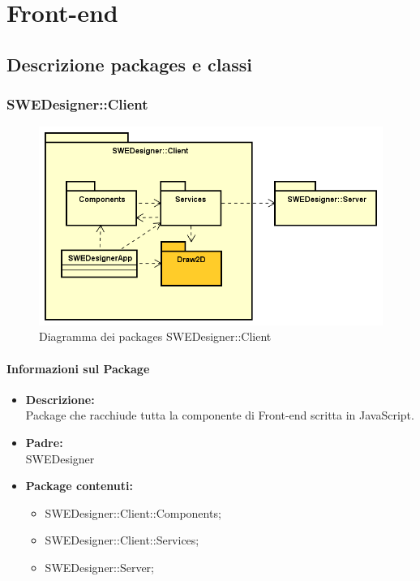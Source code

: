 \section{Front-end}

	\subsection{Descrizione packages e classi}

	\subsubsection{SWEDesigner::Client}
		 \begin{figure}[h!]
		\centering
		\includegraphics[scale=0.4]{Disegnetti/Front-End.png}
		\caption{Diagramma dei packages SWEDesigner::Client}
 		\end{figure}
		\paragraph{Informazioni sul Package}
		\begin{itemize}
			\item \textbf{Descrizione: }\\
			Package che racchiude tutta la componente di Front-end scritta in JavaScript.
			\item \textbf{Padre: }\\ SWEDesigner
			\item \textbf{Package contenuti: }
			\begin{itemize}
				\item SWEDesigner::Client::Components;
				\item SWEDesigner::Client::Services;
				\item SWEDesigner::Server;
			\end{itemize}
		\end{itemize}

